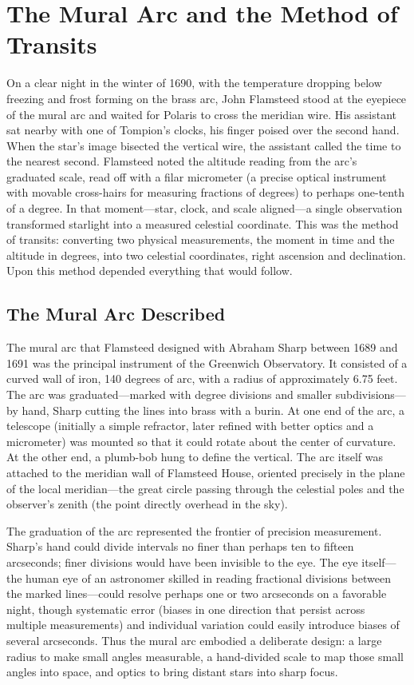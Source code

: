 \chapter{The Mural Arc and the Method of Transits}
\label{ch:mural-arc-transits}

On a clear night in the winter of 1690, with the temperature dropping below freezing and frost forming on the brass arc, John Flamsteed stood at the eyepiece of the mural arc and waited for Polaris to cross the meridian wire. His assistant sat nearby with one of Tompion's clocks, his finger poised over the second hand. When the star's image bisected the vertical wire, the assistant called the time to the nearest second. Flamsteed noted the altitude reading from the arc's graduated scale, read off with a filar micrometer (a precise optical instrument with movable cross-hairs for measuring fractions of degrees) to perhaps one-tenth of a degree. In that moment—star, clock, and scale aligned—a single observation transformed starlight into a measured celestial coordinate. This was the method of transits: converting two physical measurements, the moment in time and the altitude in degrees, into two celestial coordinates, right ascension and declination. Upon this method depended everything that would follow.

\section{The Mural Arc Described}

The mural arc that Flamsteed designed with Abraham Sharp between 1689 and 1691 was the principal instrument of the Greenwich Observatory. It consisted of a curved wall of iron, 140 degrees of arc, with a radius of approximately 6.75 feet. The arc was graduated—marked with degree divisions and smaller subdivisions—by hand, Sharp cutting the lines into brass with a burin. At one end of the arc, a telescope (initially a simple refractor, later refined with better optics and a micrometer) was mounted so that it could rotate about the center of curvature. At the other end, a plumb-bob hung to define the vertical. The arc itself was attached to the meridian wall of Flamsteed House, oriented precisely in the plane of the local meridian—the great circle passing through the celestial poles and the observer's zenith (the point directly overhead in the sky).

The graduation of the arc represented the frontier of precision measurement. Sharp's hand could divide intervals no finer than perhaps ten to fifteen arcseconds; finer divisions would have been invisible to the eye. The eye itself—the human eye of an astronomer skilled in reading fractional divisions between the marked lines—could resolve perhaps one or two arcseconds on a favorable night, though systematic error (biases in one direction that persist across multiple measurements) and individual variation could easily introduce biases of several arcseconds. Thus the mural arc embodied a deliberate design: a large radius to make small angles measurable, a hand-divided scale to map those small angles into space, and optics to bring distant stars into sharp focus.


